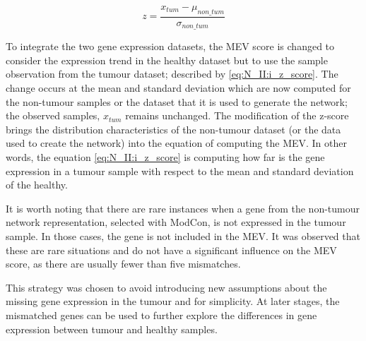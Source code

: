 \begin{equation} \label{eq:N_II:i_z_score}
z = \frac{x_{tum} - \mu_{non\_tum}}{\sigma_{non\_tum}}
\end{equation}

To integrate the two gene expression datasets, the MEV score is changed to consider the expression trend in the healthy dataset but to use the sample observation from the tumour dataset; described by \cref{eq:N_II:i_z_score}. The change occurs at the mean and standard deviation which are now computed for the non-tumour samples or the dataset that it is used to generate the network; the observed samples, $x_{tum}$ remains unchanged. The modification of the z-score brings the distribution characteristics of the non-tumour dataset (or the data used to create the network) into the equation of computing the MEV. In other words, the equation \cref{eq:N_II:i_z_score} is computing how far is the gene expression in a tumour sample with respect to the mean and standard deviation of the healthy.

It is worth noting that there are rare instances when a gene from the non-tumour network representation, selected with ModCon, is not expressed in the tumour sample. In those cases, the gene is not included in the MEV. It was observed that these are rare situations and do not have a significant influence on the MEV score, as there are usually fewer than five mismatches.

This strategy was chosen to avoid introducing new assumptions about the missing gene expression in the tumour and for simplicity. At later stages, the mismatched genes can be used to further explore the differences in gene expression between tumour and healthy samples.
